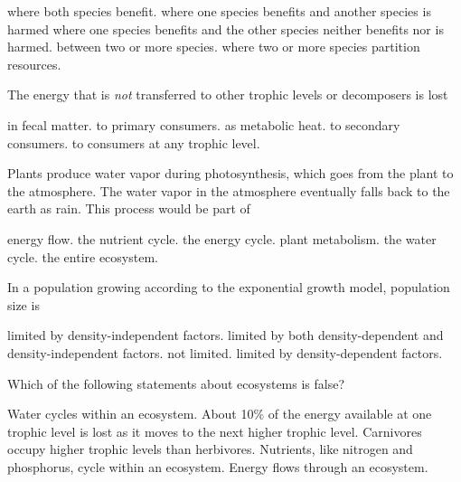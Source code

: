 \begin{choices}
\choice where both species benefit. 
\choice where one species benefits and another species is harmed 
\choice  where one species benefits and the other species neither benefits nor is harmed. 
\correctchoice between two or more species. 
\choice where two or more species partition resources. 
\end{choices}

\question
The energy that is \textit{not} transferred to other trophic levels or decomposers is lost

\begin{choices}
\choice in fecal matter.
\choice to primary consumers.
\correctchoice as metabolic heat.
\choice to secondary consumers.
\choice to consumers at any trophic level.
\end{choices}

\newpage

\question
Plants produce water vapor during photosynthesis, which goes from the plant to the atmosphere. The water vapor in the atmosphere eventually falls back to the earth as rain. This process would be part of

\begin{choices}
\choice energy flow.
\choice the nutrient cycle.
\choice the energy cycle.
\choice plant metabolism.
\correctchoice the water cycle.
\choice the entire ecosystem.
\end{choices}

\question
In a population growing according to the exponential growth model, population size is

\begin{choices}
\choice limited by density-independent factors. 
\choice limited by both density-dependent and density-independent factors. 
\correctchoice not limited. 
\choice limited by density-dependent factors. 
\end{choices}

\question
Which of the following statements about ecosystems is false?

\begin{choices}
\choice Water cycles within an ecosystem. 
\correctchoice About 10\% of the energy available at one trophic level is lost as it moves to the next higher trophic level. 
\choice Carnivores occupy higher trophic levels than herbivores. 
\choice Nutrients, like nitrogen and phosphorus, cycle within an ecosystem. 
\choice Energy flows through an ecosystem. 
\end{choices}

